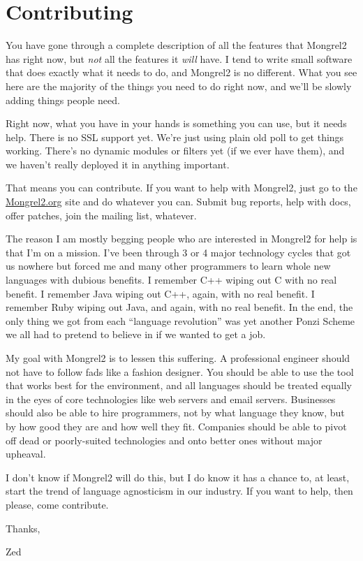 \chapter{Contributing}

You have gone through a complete description of all the features that Mongrel2 has right now,
but \emph{not} all the features it \emph{will} have.  I tend to write small software that does
exactly what it needs to do, and Mongrel2 is no different.  What you see here are the
majority of the things you need to do right now, and we'll be slowly adding things
people need.

Right now, what you have in your hands is something you can use, but it needs help.
There is no SSL support yet.  We're just using plain old poll to get things working.
There's no dynamic modules or filters yet (if we ever have them), and we haven't
really deployed it in anything important.

That means you can contribute.  If you want to help with Mongrel2, just go to
the \href{http://mongrel2.org}{Mongrel2.org} site and do whatever you can.  Submit bug
reports, help with docs, offer patches, join the mailing list, whatever.

The reason I am mostly begging people who are interested in Mongrel2 for help is that I'm
on a mission.  I've been through 3 or 4 major technology cycles that got us nowhere
but forced me and many other programmers to learn whole new languages with dubious
benefits.  I remember C++ wiping out C with no real benefit.  I remember Java wiping
out C++, again, with no real benefit.  I remember Ruby wiping out Java, and again, with no
real benefit.  In the end, the only thing we got from each ``language revolution'' was
yet another Ponzi Scheme we all had to pretend to believe in if we wanted to get a
job.

My goal with Mongrel2 is to lessen this suffering.  A professional engineer should not
have to follow fads like a fashion designer.  You should be able to use the tool that
works best for the environment, and all languages should be treated equally in the eyes
of core technologies like web servers and email servers.  Businesses should also be
able to hire programmers, not by what language they know, but by how good they are and
how well they fit.  Companies should be able to pivot off dead or poorly-suited
technologies and onto better ones without major upheaval.

I don't know if Mongrel2 will do this, but I do know it has a chance to, at least, start
the trend of language agnosticism in our industry.  If you want to help, then please,
come contribute.

Thanks,

\indent Zed
